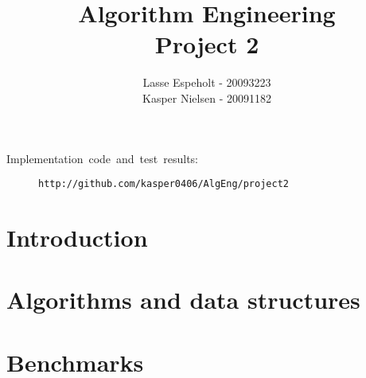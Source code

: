 \documentclass[a4paper,12pt]{article}
\begin{document}
\title{Algorithm Engineering\\Project 2}

\author{Lasse Espeholt - 20093223\\
Kasper Nielsen - 20091182}

\maketitle
\vfill{}
\begin{description}
\item [{Implementation~code~and~test~results:}] \texttt{http://github.com/kasper0406/AlgEng/project2}
\end{description}
\pagebreak{}\tableofcontents{}\pagebreak{}

\section{Introduction}


\section{Algorithms and data structures}


\section{Benchmarks}

\end{document}
